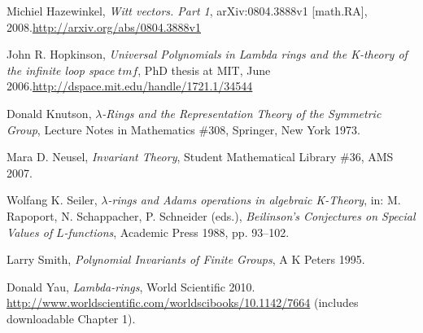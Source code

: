 \documentclass[numbers=enddot,12pt,final,onecolumn,notitlepage]{scrartcl}%
\begin{document}
\begin{thebibliography}{999999999}
Michiel Hazewinkel, \textit{Witt vectors. Part
1}, arXiv:0804.3888v1 [math.RA], 2008.\newline\url{http://arxiv.org/abs/0804.3888v1}

John R. Hopkinson, \textit{Universal Polynomials
in Lambda rings and the K-theory of the infinite loop space }$tmf$, PhD thesis
at MIT, June 2006.\newline\url{http://dspace.mit.edu/handle/1721.1/34544}

Donald Knutson, $\lambda$\textit{-Rings and the
Representation Theory of the Symmetric Group}, Lecture Notes in Mathematics
\#308, Springer, New York 1973.

Mara D. Neusel, \textit{Invariant Theory}, Student
Mathematical Library \#36, AMS 2007.

Wolfang K. Seiler, $\lambda$\textit{-rings and
Adams operations in algebraic K-Theory}, in: M. Rapoport, N. Schappacher, P.
Schneider (eds.), \textit{Beilinson's Conjectures on Special Values of }%
$L$\textit{-functions}, Academic Press 1988, pp. 93--102.

Larry Smith, \textit{Polynomial Invariants of Finite
Groups}, A K Peters 1995.

Donald Yau, \textit{Lambda-rings}, World Scientific
2010.\newline%
\url{http://www.worldscientific.com/worldscibooks/10.1142/7664}\newline%
(includes downloadable Chapter 1).
\end{thebibliography}
\end{document}
